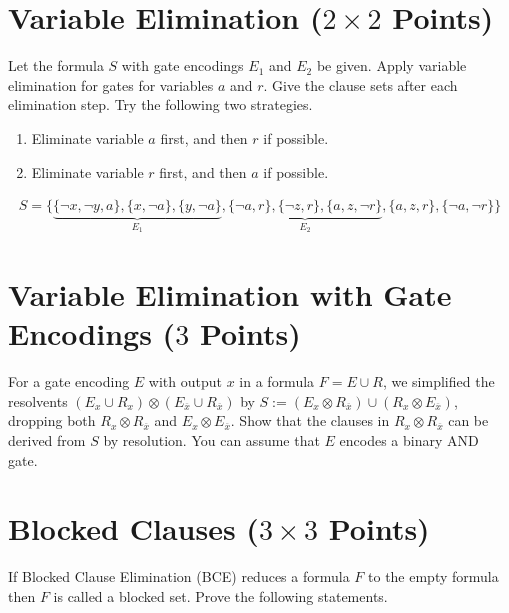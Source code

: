 \documentclass[a4paper]{article}
\begin{document}

\newcommand{\statetilled}{T}
\newcommand{\statetobetilled}{$+$}
\newcommand{\statenottobetilled}{$-$}



\section{Variable Elimination ($2 \times 2$ Points)}

Let the formula $S$ with gate encodings $E_1$ and $E_2$ be given.
Apply variable elimination for gates for variables $a$ and $r$.
Give the clause sets after each elimination step.
Try the following two strategies.

\begin{enumerate}\setlength{\itemsep}{1ex}
\item Eliminate variable $a$ first, and then $r$ if possible.
\item Eliminate variable $r$ first, and then $a$ if possible.
\end{enumerate}
\vspace*{-1ex}
\begin{align*}
S = \bigl\{ \underbrace{\{ \lnot x, \lnot y, a \}, \{ x, \lnot a \}, \{ y, \lnot a \}}_{E_1},
\underbrace{\{ \lnot a, r \}, \{ \lnot z, r \}, \{ a, z, \lnot r \}}_{E_2}, \{ a, z, r \},
\{ \lnot a, \lnot r \} \bigr\}
\end{align*}


\section{Variable Elimination with Gate Encodings ($3$ Points)}

For a gate encoding $E$ with output $x$ in a formula $F = E \cup R$,
we simplified the resolvents $(E_x \cup R_x) \otimes (E_{\overline x} \cup R_{\overline x})$ by
$S := (E_x \otimes R_{\overline x}) \cup (R_x \otimes E_{\overline x})$, dropping both
$R_x \otimes R_{\overline x}$ and $E_x \otimes E_{\overline x}$.
Show that the clauses in $R_x \otimes R_{\overline x}$ can be derived from $S$ by resolution.
You can assume that $E$ encodes a binary AND gate.


\section{Blocked Clauses ($3\times 3$ Points)}

If Blocked Clause Elimination (BCE) reduces a formula $F$ to the empty formula then $F$ is called a blocked set.
Prove the following statements.
\end{document}
